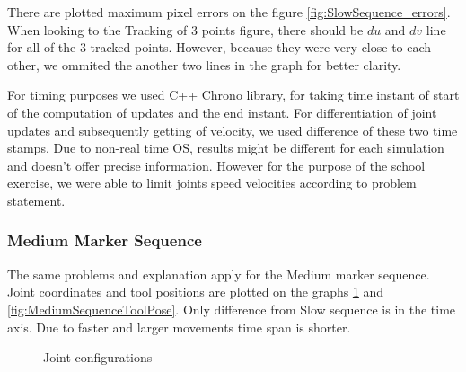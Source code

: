 \documentclass[]{scrartcl}
\begin{document}
There are plotted maximum pixel errors on the figure \ref{fig:SlowSequence_errors}. When looking to the Tracking of 3 points figure, there should be $du$ and $dv$ line for all of the 3 tracked points. However, because they were very close to each other, we ommited the another two lines in the graph for better clarity.

For timing purposes we used C++ Chrono library, for taking time instant of start of the computation of updates and the end instant. For differentiation of joint updates and subsequently getting of velocity, we used difference of these two time stamps. Due to non-real time OS, results might be different for each simulation and doesn't offer precise information. However for the purpose of the school exercise, we were able to limit joints speed velocities according to problem statement.


\subsubsection*{Medium Marker Sequence}
The same problems and explanation apply for the Medium marker sequence. Joint coordinates and tool positions are plotted on the graphs \ref{fig:MediumSequenceJoints} and \ref{fig:MediumSequenceToolPose}. Only difference from Slow sequence is in the time axis. Due to faster and larger movements time span is shorter.
\begin{figure}[!htp]
	\hfill
	\caption{Joint configurations}
	\label{fig:MediumSequenceJoints}
\end{figure}
\end{document}
